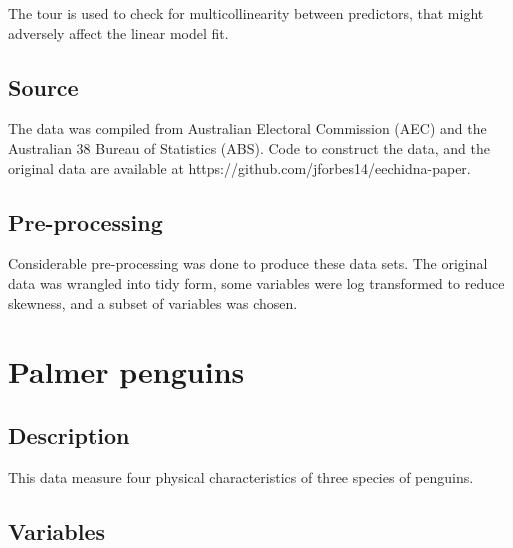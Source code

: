 \documentclass[
  letterpaper,
]{krantz}
\begin{document}
The tour is used to check for multicollinearity between predictors, that
might adversely affect the linear model fit.

\subsection*{Source}\label{source-2}

The data was compiled from Australian Electoral Commission (AEC) and the
Australian 38 Bureau of Statistics (ABS). Code to construct the data,
and the original data are available at
https://github.com/jforbes14/eechidna-paper.

\subsection*{Pre-processing}\label{pre-processing-2}

Considerable pre-processing was done to produce these data sets. The
original data was wrangled into tidy form, some variables were log
transformed to reduce skewness, and a subset of variables was chosen.

\section{Palmer penguins}\label{palmer-penguins}

\subsection*{Description}\label{description-3}

This data measure four physical characteristics of three species of
penguins.

\subsection*{Variables}\label{variables-3}
\end{document}
